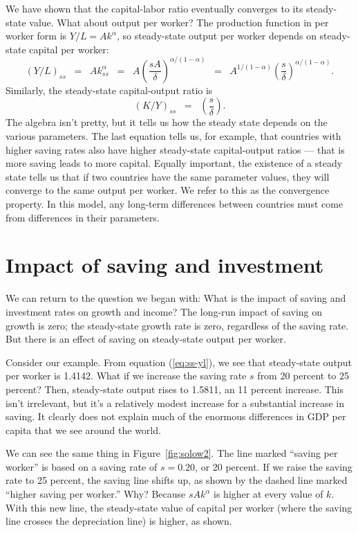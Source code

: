 We have shown that the capital-labor ratio eventually converges to its steady-state value.
What about output per worker?
The production function in per worker form is $ Y/L = A k^\alpha$,
so steady-state output per worker depends on steady-state capital per worker:
\begin{equation}
    (Y/L)_{ss}  \;\;=\;\; A k_{ss}^\alpha
                \;\;=\;\; A \left( \frac{sA}{\delta} \right)^{\alpha/(1-\alpha)}
                \;\;=\;\; A^{1/(1-\alpha)} \left( \frac{s}{\delta}
                \right)^{\alpha/(1-\alpha)} .
                \label{eq:ss-yl}
\end{equation}
Similarly, the steady-state capital-output ratio is
\[
    (K/Y)_{ss} \;\;=\;\; \left( \frac{s}{\delta} \right) .
\]
The algebra isn't pretty, but it tells us how the steady state
depends on the various parameters.
The last equation tells us, for example, that countries with higher saving rates
also have higher steady-state capital-output ratios --- that is more saving leads to more capital.
Equally important, the existence
of a steady state tells us that if two countries have the same
parameter values, they will converge to the same output per
worker. We refer to this as the convergence property. In this
model, any long-term differences between countries must come from
differences in their parameters.


\section{Impact of saving and investment}

We can return to the question we began with: What is the impact of saving
and investment rates on growth and income?
The long-run impact of saving on growth is zero;
the steady-state growth rate is zero, regardless of the saving rate.
But there is an effect of saving on steady-state output per worker.


Consider our example.
From equation (\ref{eq:ss-yl}), we see that steady-state
output per worker is 1.4142.
What if we increase the saving rate $s$ from 20 percent to 25 percent?
Then, steady-state output rises to 1.5811, an 11 percent increase.
This isn't irrelevant, but it's a relatively modest increase
for a substantial increase in saving.
It clearly does not explain much of the enormous differences
in GDP per capita that we see around the world.

We can see the same thing in Figure~\ref{fig:solow2}. The line marked
``saving per worker'' is based on a saving rate of $s = 0.20$, or
20 percent. If we raise the saving rate to  25 percent,
the saving line shifts up, as
shown by the dashed line marked ``higher saving per worker.'' Why?
Because $s A k^\alpha $ is higher at every value of $k$. With this
new line, the steady-state value of capital per worker (where the
saving line crosses the depreciation line) is higher, as shown.


